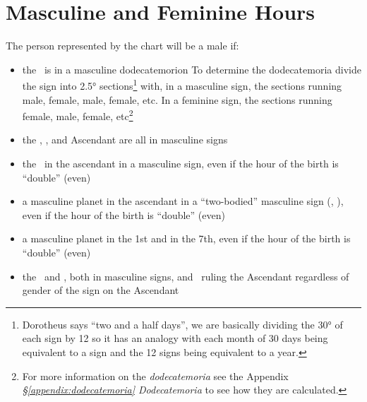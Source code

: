 \section{Masculine and Feminine Hours}

The person represented by the chart will be a male if:
\begin{itemize}[topsep=0em, itemsep=0em]
\item the  \Moon\, is in a masculine dodecatemorion
 \newline\newline
To determine the dodecatemoria divide the sign into 2.5° sections\footnote{Dorotheus says ``two and a half days'', we are basically dividing the 30° of each sign by 12 so it has an analogy with each month of 30 days being equivalent to a sign and the 12 signs being equivalent to a year.} with, in a masculine sign, the sections running male, female, male, female, etc. In a feminine sign, the sections running female, male, female, etc\footnote{For more information on the  \textsl{dodecatemoria} see the Appendix  \textsl{\S\ref{appendix:dodecatemoria} Dodecatemoria} to see how they are calculated.}

\item the \Sun, \Moon, and Ascendant are all in masculine signs

\item the \Sun\, in the ascendant in a masculine sign, even if the hour of the birth is ``double'' (even)

\item a masculine planet in the ascendant in a ``two-bodied'' masculine sign (\Gemini, \Sagittarius), even if the hour of the birth is ``double'' (even)

\item a masculine planet in the 1st and in the 7th,  even if the hour of the birth is ``double'' (even) 

\item the \Sun\, and \Moon, both in masculine signs, and \Jupiter\, ruling the Ascendant regardless of gender of the sign on the Ascendant

\end{itemize}